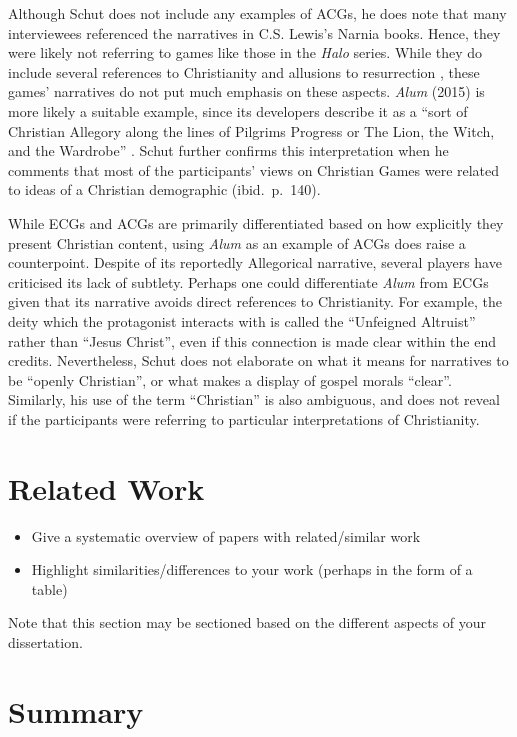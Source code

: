 Although Schut does not include any examples of \acp{ACG}, he does note that many interviewees referenced the narratives in C.S. Lewis's Narnia books. Hence, they were likely not referring to games like those in the \textit{Halo} series. While they do include several references to Christianity and allusions to resurrection \parencite{paulissen_dark_2018}, these games' narratives do not put much emphasis on these aspects. \textit{Alum} (2015) is more likely a suitable example, since its developers describe it as a ``sort of Christian Allegory along the lines of Pilgrims Progress or The Lion, the Witch, and the Wardrobe'' \parencite{crashable_studios_alum_2015}. Schut further confirms this interpretation when he comments that most of the participants' views on Christian Games were related to ideas of a Christian demographic (ibid.~p.~140).

While \acp{ECG} and \acp{ACG} are primarily differentiated based on how explicitly they present Christian content, using \textit{Alum} as an example of \acp{ACG} does raise a counterpoint. Despite of its reportedly Allegorical narrative, several players have criticised its lack of subtlety\parencite {arkane_review_2015, baxted_review_2015, virotti_review_2017}. Perhaps one could differentiate \textit{Alum} from \acp{ECG} given that its narrative avoids direct references to Christianity. For example, the deity which the protagonist interacts with is called the ``Unfeigned Altruist'' rather than ``Jesus Christ'', even if this connection is made clear within the end credits. Nevertheless, Schut does not elaborate on what it means for narratives to be ``openly Christian'', or what makes a display of gospel morals ``clear''. Similarly, his use of the term ``Christian'' is also ambiguous, and does not reveal if the participants were referring to particular interpretations of Christianity.

\section{Related Work}

  \begin{itemize}
   \item Give a systematic overview of papers with related/similar work
   \item Highlight similarities/differences to your work (perhaps in the form of a table)
  \end{itemize}

  Note that this section may be sectioned based on the different aspects of your dissertation.
\fi

\section{Summary}
\blindtext
